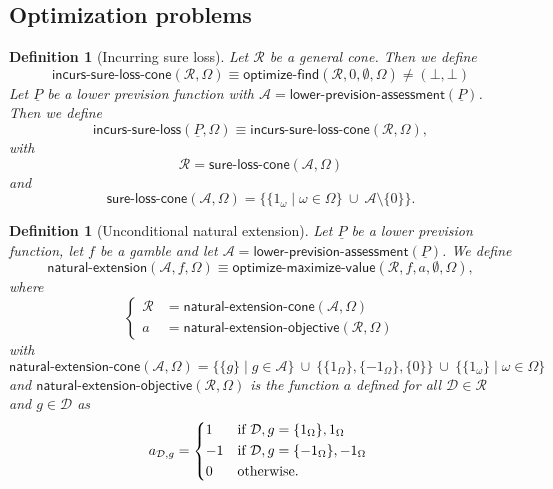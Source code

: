 \documentclass{article}
\theoremstyle{mytheorem}
\newtheorem{definition}[theorem]{Definition}
\newcommand{\func}[1]{\ensuremath{\textsf{#1}}} %
\newcommand{\set}[1]{\ensuremath{\{ #1 \} }} %
\begin{document}
\subsection{Optimization problems}

\begin{definition}[Incurring sure loss]
Let $\mathcal{R}$ be a general cone.
Then we define
\[
  \func{incurs-sure-loss-cone}(\mathcal{R}, \Omega) \equiv \func{optimize-find}(\mathcal{R}, 0, \emptyset, \Omega) \neq (\bot, \bot)
\]
Let $\underline{P}$ be a lower prevision function with $\mathcal{A} = \func{lower-prevision-assessment}(\underline{P})$.
Then we define
\[
  \func{incurs-sure-loss}(\underline{P}, \Omega) \equiv 
  \func{incurs-sure-loss-cone}(\mathcal{R}, \Omega),
\]
with
\[
  \mathcal{R} = \func{sure-loss-cone}(\mathcal{A}, \Omega)
\]
and
\[
  \func{sure-loss-cone}(\mathcal{A}, \Omega) = \set{ \set{1_\omega \mid \omega \in \Omega } ~\cup~ \mathcal{A} \setminus \set{0} }.
\]
\end{definition}

\begin{definition}[Unconditional natural extension]
Let $\underline{P}$ be a lower prevision function, let $f$ be a gamble and let $\mathcal{A} = \func{lower-prevision-assessment}(\underline{P})$.
We define
\[
  \func{natural-extension}(\mathcal{A}, f, \Omega) \equiv \func{optimize-maximize-value}(\mathcal{R}, f, a, \emptyset, \Omega),
\]
where
\[
  \left\{
  \begin{array}{ll}
    \mathcal{R} &= \func{natural-extension-cone}(\mathcal{A}, \Omega) \\[0.1cm]
    a &= \func{natural-extension-objective}(\mathcal{R}, \Omega)
  \end{array}
  \right.
\]
with
\[
    \func{natural-extension-cone}(\mathcal{A}, \Omega) =
        \set{ \set{g} \mid g \in \mathcal{A} }
        ~\cup~ \set{ \set{1_\Omega}, \set{-1_\Omega}, \set{0} }
        ~\cup~ \set{ \set{1_\omega } \mid \omega \in \Omega }
\]
and $\func{natural-extension-objective}(\mathcal{R}, \Omega)$ is the function $a$ defined for all $\mathcal{D} \in \mathcal{R}$ and $g \in \mathcal{D}$ as
\begin{equation} \label{eq:natural-extension-objective}
  a_{\mathcal{D},g} =
  \begin{cases*}
    1 & if $\mathcal{D},g = \set{1_\Omega}, 1_\Omega$ \\
    -1 & if $\mathcal{D},g = \set{-1_\Omega}, -1_\Omega$ \\
    0 & otherwise.
  \end{cases*}
\end{equation}
\end{definition}
\end{document}
